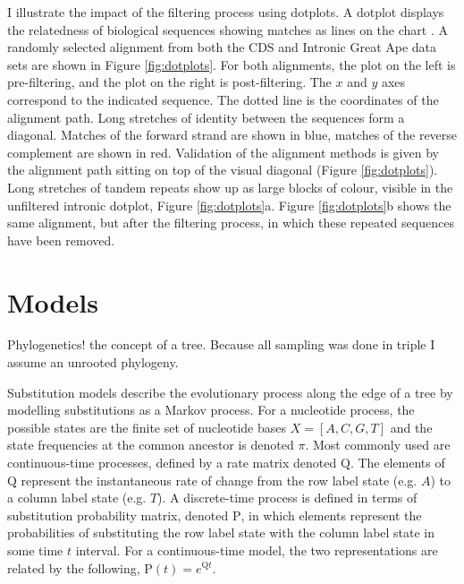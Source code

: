 I illustrate the impact of the filtering process using dotplots. A dotplot displays the relatedness of biological sequences showing matches as lines on the chart \citep{Gibbs1970TheSequences}. A randomly selected alignment from both the CDS and Intronic Great Ape data sets are shown in Figure \ref{fig:dotplots}. For both alignments, the plot on the left is pre-filtering, and the plot on the right is post-filtering. The $x$ and $y$ axes correspond to the indicated sequence. The dotted line is the coordinates of the alignment path. Long stretches of identity between the sequences form a diagonal. Matches of the forward strand are shown in blue, matches of the reverse complement are shown in red. Validation of the alignment methods is given by the alignment path sitting on top of the visual diagonal (Figure \ref{fig:dotplots}). Long stretches of tandem repeats show up as large blocks of colour, visible in the unfiltered intronic dotplot, Figure \ref{fig:dotplots}a. Figure \ref{fig:dotplots}b shows the same alignment, but after the filtering process, in which these repeated sequences have been removed.



\section{Models}

Phylogenetics! the concept of a tree. Because all sampling was done in triple I assume an unrooted phylogeny. 

Substitution models describe the evolutionary process along the edge of a tree by modelling substitutions as a Markov process. For a nucleotide process, the possible states are the finite set of nucleotide bases $X = [A, C, G, T]$ and the state frequencies at the common ancestor is denoted $\pi$. Most commonly used are continuous-time processes, defined by a rate matrix denoted $\mathrm{Q}$. The elements of $\mathrm{Q}$ represent the instantaneous rate of change from the row label state (e.g. $A$) to a column label state (e.g. $T$). A discrete-time process is defined in terms of substitution probability matrix, denoted $\mathrm{P}$, in which elements represent the probabilities of substituting the row label state with the column label state in some time $t$ interval. For a continuous-time model, the two representations are related by the following, $\mathrm{P}(t) = e^{\mathrm{Q}t}$. 

